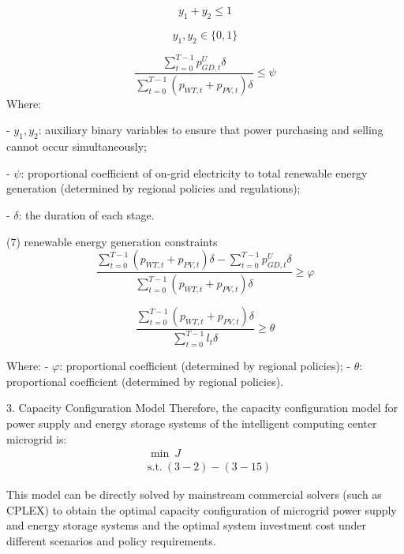 \documentclass{article}
\begin{document}
\begin{equation}
y_1 + y_2 \leq 1
\end{equation}

\begin{equation}
y_1, y_2 \in \{0,1\}
\end{equation}

\begin{equation}
\frac{\sum_{t=0}^{T-1}p_{GD,t}^{U}\delta}{\sum_{t=0}^{T-1}(p_{WT,t}+p_{PV,t})\delta} \leq \psi 
\end{equation}
Where:

\noindent - $y_1, y_2$: auxiliary binary variables to ensure that power purchasing and selling cannot occur simultaneously;

\noindent - $\psi$: proportional coefficient of on-grid electricity to total renewable energy generation (determined by regional policies and regulations);

\noindent - $\delta$: the duration of each stage. 

(7) renewable energy generation constraints
\begin{equation}
\frac{\sum_{t=0}^{T-1}(p_{WT,t}+p_{PV,t})\delta-\sum_{t=0}^{T-1}p_{GD,t}^{U}\delta}{\sum_{t=0}^{T-1}(p_{WT,t}+p_{PV,t})\delta} \geq \varphi 
\end{equation}

\begin{equation}
\frac{\sum_{t=0}^{T-1}(p_{WT,t}+p_{PV,t})\delta}{\sum_{t=0}^{T-1} l_t \delta} \geq \theta
\end{equation}

Where:
\noindent - $\varphi$: proportional coefficient (determined by regional policies);
\noindent - $\theta$: proportional coefficient (determined by regional policies).

3. Capacity Configuration Model
Therefore, the capacity configuration model for power supply and energy storage systems of the intelligent computing center microgrid is:
\begin{equation}
\begin{aligned}
&\min ~ J \\
&\text{s.t.} ~(3-2)-(3-15)
\end{aligned}
\end{equation}

This model can be directly solved by mainstream commercial solvers (such as CPLEX) to obtain the optimal capacity configuration of microgrid power supply and energy storage systems and the optimal system investment cost under different scenarios and policy requirements.
\end{document}
